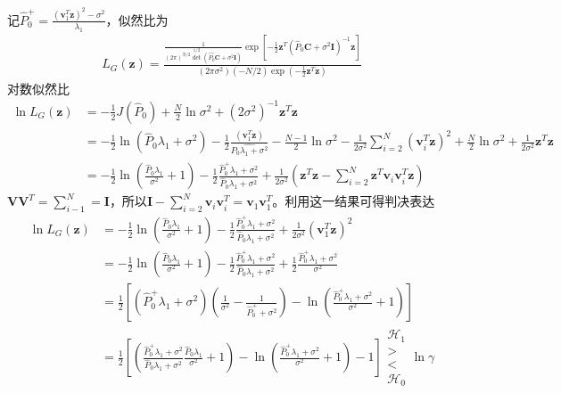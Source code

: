 \documentclass[fontset=windows]{article}
\numberwithin{figure}{section}
\begin{document}
记\(\hat{P}_0^+=\frac{(\mathbf{v}_1^T\mathbf{z})^2-\sigma^2}{\lambda_1}\)，似然比为
\begin{align*}
	L_G(\mathbf{z})=\frac{\frac{1}{(2\pi)^{N/2}\det^{1/2}(\hat{P_0}\mathbf{C}+\sigma^2\mathbf{I})}
		\exp\left[-\frac{1}{2}\mathbf{z}^T(\hat{P}_0\mathbf{C}+\sigma^2\mathbf{I})^{-1}\mathbf{z}\right]}
	{(2\pi \sigma^2)({-N/2})\exp\left(-\frac{1}{2}\mathbf{z}^T\mathbf{z}\right)}
\end{align*}
对数似然比
\begin{align*}
	\ln L_G(\mathbf{z})
	 & =-\frac{1}{2}J(\hat{P}_0)+\frac{N}{2}\ln \sigma^2+(2\sigma^2)^{-1}\mathbf{z}^T\mathbf{z}                                                               \\
	 & =-\frac{1}{2}\ln(\hat{P}_0\lambda_1+\sigma^2)-\frac{1}{2}\frac{(\mathbf{v}_1^T\mathbf{z})}{\hat{P_0\lambda_1+\sigma^2}}
	-\frac{N-1}{2}\ln \sigma^2-\frac{1}{2\sigma^2}\sum_{i=2}^{N}(\mathbf{v}_i^T\mathbf{z})^2+\frac{N}{2}\ln\sigma^2+\frac{1}{2\sigma^2}\mathbf{z}^T\mathbf{z} \\
	 & =-\frac{1}{2}\ln\left(\frac{\hat{P}_0\lambda_1}{\sigma^2}+1\right)-\frac{1}{2}\frac{\hat{P}_0^+\lambda_1+\sigma^2}{\hat{P}_0\lambda_1+\sigma^2}
	+\frac{1}{2\sigma^2}\left(\mathbf{z}^T\mathbf{z}-\sum_{i=2}^{N}\mathbf{z}^T\mathbf{v}_i\mathbf{v}_i^T\mathbf{z}\right)
\end{align*}
\(\mathbf{VV}^T=\sum_{i-1}^{N}=\mathbf{I}\)，所以\(\mathbf{I}-\sum_{i=2}^{N}\mathbf{v}_i\mathbf{v}_i^T=\mathbf{v}_1\mathbf{v}_1^T\)。利用这一结果可得判决表达
\begin{align*}
	\ln L_G(\mathbf{z})
	 & =-\frac{1}{2}\ln\left(\frac{\hat{P}_0\lambda_1}{\sigma^2}+1\right)
	-\frac{1}{2}\frac{\hat{P}_0^+\lambda_1+\sigma^2}{\hat{P}_0\lambda_1+\sigma^2}
	+\frac{1}{2\sigma^2}\left(\mathbf{v}_1^T\mathbf{z}\right)^2                                                                              \\
	 & =-\frac{1}{2}\ln\left(\frac{\hat{P}_0\lambda_1}{\sigma^2}+1\right)
	-\frac{1}{2}\frac{\hat{P}_0^+\lambda_1+\sigma^2}{\hat{P}_0\lambda_1+\sigma^2}
	+\frac{1}{2}\frac{\hat{P}_0^+\lambda_1+\sigma^2}{\sigma^2}                                                                               \\
	 & =\frac{1}{2}\left[(\hat{P}_0^+\lambda_1+\sigma^2)(\frac{1}{\sigma^2}-\frac{1}{\hat{P}_0^++\sigma^2})
	-\ln\left(\frac{\hat{P}_0^+\lambda_1+\sigma^2}{\sigma^2}+1\right)\right]                                                                 \\
	 & =\frac{1}{2}\left[\left(\frac{\hat{P}_0^+\lambda_1+\sigma^2}{\hat{P}_0\lambda_1+\sigma^2}\frac{\hat{P}_0\lambda_1}{\sigma^2}+1\right)
		-\ln\left(\frac{\hat{P}_0^+\lambda_1+\sigma^2}{\sigma^2}+1\right)-1\right]
	\begin{matrix}
		\mathcal{H}_1 \\>\\<\\\mathcal{H}_0
	\end{matrix}\ln \gamma
\end{align*}
\end{document}
